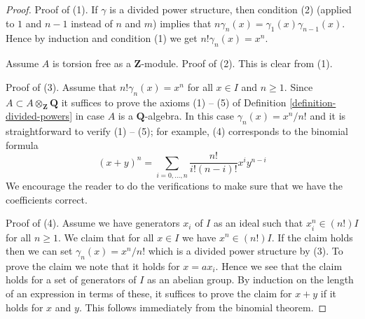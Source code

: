 \documentclass{stacks-project}
\theoremstyle{plain}
\theoremstyle{definition}
\theoremstyle{remark}
\numberwithin{equation}{subsection}
\begin{document}
\begin{proof}
Proof of (1). If $\gamma$ is a divided power structure, then condition
(2) (applied to $1$ and $n-1$ instead of $n$ and $m$)
implies that $n \gamma_n(x) = \gamma_1(x)\gamma_{n - 1}(x)$. Hence
by induction and condition (1) we get $n! \gamma_n(x) = x^n$.

\medskip\noindent
Assume $A$ is torsion free as a $\mathbf{Z}$-module.
Proof of (2). This is clear from (1).

\medskip\noindent
Proof of (3). Assume that $n! \gamma_n(x) = x^n$ for all $x \in I$ and
$n \geq 1$. Since $A \subset A \otimes_{\mathbf{Z}} \mathbf{Q}$ it suffices
to prove the axioms (1) -- (5) of Definition
\ref{definition-divided-powers} in case $A$ is a $\mathbf{Q}$-algebra.
In this case $\gamma_n(x) = x^n/n!$ and it is straightforward
to verify (1) -- (5); for example, (4) corresponds to the binomial
formula
$$
(x + y)^n = \sum_{i = 0, \ldots, n} \frac{n!}{i!(n - i)!} x^iy^{n - i}
$$
We encourage the reader to do the verifications
to make sure that we have the coefficients correct.

\medskip\noindent
Proof of (4). Assume we have generators $x_i$ of $I$ as an ideal
such that $x_i^n \in (n!)I$ for all $n \geq 1$. We claim that
for all $x \in I$ we have $x^n \in (n!)I$. If the claim holds then
we can set $\gamma_n(x) = x^n/n!$ which is a divided power structure by (3).
To prove the claim we note that it holds for $x = ax_i$. Hence we see
that the claim holds for a set of generators of $I$ as an abelian group.
By induction on the length of an expression in terms of these, it suffices
to prove the claim for $x + y$ if it holds for $x$ and $y$. This
follows immediately from the binomial theorem.
\end{proof}
\end{document}

